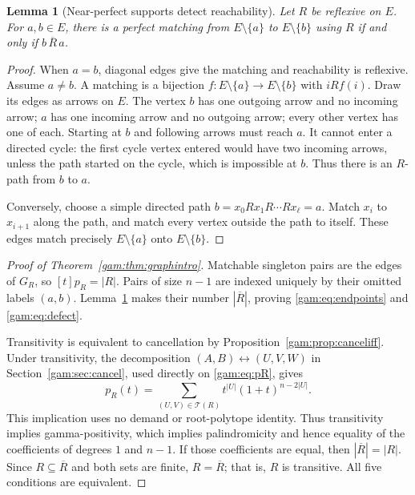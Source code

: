 \documentclass[11pt]{article}
\numberwithin{equation}{section}
\newtheorem{lemma}[theorem]{Lemma}
\theoremstyle{definition}
\newcommand{\Tset}{\mathcal T}
\begin{document}
\begin{lemma}[Near-perfect supports detect reachability]\label{gam:lem:reach}
Let $R$ be reflexive on $E$. For $a,b\in E$, there is a perfect matching
from $E\setminus\{a\}$ to $E\setminus\{b\}$ using $R$ if and only if
$b\,\overline R\,a$.
\end{lemma}
\begin{proof}
When $a=b$, diagonal edges give the matching and reachability is reflexive.
Assume $a\ne b$. A matching is a bijection
$f:E\setminus\{a\}\to E\setminus\{b\}$ with $iRf(i)$. Draw its edges as
arrows on $E$. The vertex $b$ has one outgoing arrow and no incoming arrow;
$a$ has one incoming arrow and no outgoing arrow; every other vertex has
one of each. Starting at $b$ and following arrows must reach $a$. It cannot
enter a directed cycle: the first cycle vertex entered would have two
incoming arrows, unless the path started on the cycle, which is impossible
at $b$. Thus there is an $R$-path from $b$ to $a$.

Conversely, choose a simple directed path
$b=x_0Rx_1R\cdots Rx_\ell=a$. Match $x_i$ to $x_{i+1}$ along the path, and
match every vertex outside the path to itself. These edges match precisely
$E\setminus\{a\}$ onto $E\setminus\{b\}$.
\end{proof}

\begin{proof}[Proof of Theorem~\ref{gam:thm:graphintro}]
Matchable singleton pairs are the edges of $G_R$, so $[t]p_R=|R|$.
Pairs of size $n-1$ are indexed uniquely by their omitted labels $(a,b)$.
Lemma~\ref{gam:lem:reach} makes their number $|\overline R|$, proving
\eqref{gam:eq:endpoints} and \eqref{gam:eq:defect}.

Transitivity is equivalent to cancellation by
Proposition~\ref{gam:prop:canceliff}. Under transitivity, the decomposition
$(A,B)\leftrightarrow(U,V,W)$ in Section~\ref{gam:sec:cancel}, used directly on
\eqref{gam:eq:pR}, gives
\[
 p_R(t)=\sum_{(U,V)\in\Tset(R)}t^{|U|}(1+t)^{n-2|U|}.
\]
This implication uses no demand or root-polytope identity. Thus transitivity
implies gamma-positivity, which implies palindromicity and hence equality of
the coefficients of degrees $1$ and $n-1$. If those coefficients are equal,
then $|\overline R|=|R|$. Since $R\subseteq\overline R$ and both sets are
finite, $R=\overline R$; that is, $R$ is transitive. All five conditions are
equivalent.
\end{proof}
\end{document}
